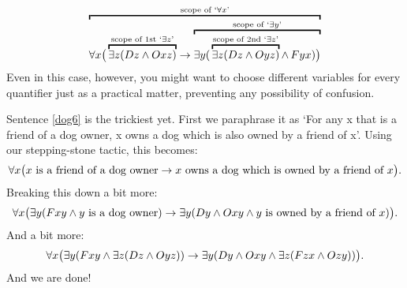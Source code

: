 $$\overbracket{\forall x\bigl(\,\overbracket{\exists z(Dz \eand Oxz)}^{\text{scope of 1st `}\exists z\text{'}}\eif \overbracket{\exists y(\,\overbracket{\exists z(Dz \eand Oyz)}^{\text{scope of 2nd `}\exists z\text{'}}\mathop{\eand} Fyx) \bigr)}^{\text{scope of `}\exists y\text{'}}}^{\text{scope of `}\forall x\text{'}}$$
Even in this case, however, you might want to choose different variables for every quantifier just as a practical matter, preventing any possibility of confusion. 

Sentence \ref{dog6} is the trickiest yet. First we paraphrase it as `For any x that is a friend of a dog owner, x owns a dog which is also owned by a friend of x'. Using our stepping-stone tactic, this becomes:
$$\forall x\bigl(x\text{ is a friend of a dog owner}\rightarrow x\text{ owns a dog which is owned by a friend of }x\bigr).$$
Breaking this down a bit more:
$$\forall x\bigl(\exists y(Fxy \wedge y\text{ is a dog owner})\rightarrow \exists y(Dy \wedge Oxy \wedge y\text{ is owned by a friend of }x) \bigr).$$
And a bit more: 
$$\forall x\bigl(\exists y(Fxy \wedge \exists z(Dz \wedge Oyz)) \rightarrow \exists y(Dy \wedge Oxy \wedge \exists z(Fzx \wedge Ozy)) \bigr).$$
And we are done!



